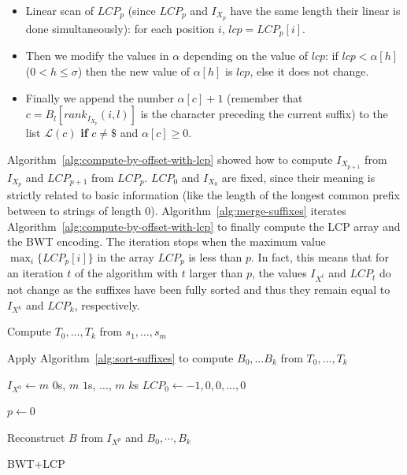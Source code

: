 \documentclass[a4paper,12pt, oneside]{article}
\begin{document}
\begin{itemize}
	\item Linear scan of $LCP_p$ (since $LCP_p$ and $I_{X_p}$ have the same length their linear is done simultaneously): for each position $i$, $lcp = LCP_p[i]$.
	\item Then we modify the values in $\alpha$ depending on the value of $lcp$: if $lcp < \alpha[h]$ ($0 < h \leq \sigma$) then the new value of $\alpha[h]$ is $lcp$, else it does not change.
	\item Finally we append the number $\alpha[c] + 1$ (remember that $c = B_l[rank_{I_{X_p}}(i, l)]$ is the character preceding the current suffix) to the list $\mathcal{L}(c)$ \textbf{if} $c \neq \$$ and $\alpha[c] \geq 0$.
\end{itemize}

Algorithm~\ref{alg:compute-by-offset-with-lcp} showed how to compute $I_{X_{p+1}}$ from $I_{X_p}$ and $LCP_{p+1}$ from $LCP_p$. $LCP_0$ and $I_{X_0}$ are fixed, since their meaning is strictly related to basic information (like the length of the longest common prefix between to strings of length $0$). Algorithm~\ref{alg:merge-suffixes} iterates Algorithm~\ref{alg:compute-by-offset-with-lcp} to finally compute the LCP array and the BWT encoding. The iteration stops when the maximum value $\max_{i}\{LCP_{p}[i]\}$ in the array $LCP_{p}$ is less than $p$. In fact, this means that for an  iteration  $t$ of the algorithm  with $t$ larger than $p$, the values $I_{X^{t}}$ and $LCP_{t}$ do not change as the suffixes have been fully sorted and thus they remain equal to $I_{X^k}$ and $LCP_k$, respectively. 


\begin{algorithm}[htb!]

        Compute $T_{0}, \ldots , T_{k}$ from $s_{1}, \ldots , s_{m}$\;\label{algo:ms-prepare-t}
        
        Apply Algorithm~\ref{alg:sort-suffixes} to compute $B_{0}, \ldots B_{k}$
        from $T_{0}, \ldots , T_{k}$\;\label{alg:ms-compute-partial}
        
        $I_{X^0} \gets m$ $0$s, $m$ $1$s, $\ldots$, $m$ $k$s\;
	$LCP_0 \gets -1, 0, 0, \ldots, 0$\;
	
	$p \gets 0$\;
			
	Reconstruct $B$ from $I_{X^p}$ and $B_0, \cdots, B_k$\;
	\caption{BWT+LCP}\label{alg:merge-suffixes}
\end{algorithm}
\end{document}
